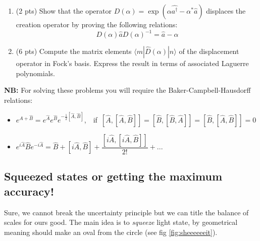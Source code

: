 \begin{hw}


	\begin{enumerate}
	
	\item (2 pts) Show that the  operator $D(\alpha)=\exp(\alpha\hat{a^\dagger}-\alpha^*\hat{a})$ { displaces} the creation operator by proving the following relations:
	$$
	D(\alpha)\hat{a}D(\alpha)^{-1}=\hat{a}-\alpha
	$$
	\item (6 pts) Compute the matrix elements $\langle m| \hat{D}(\alpha)|n\rangle$ of the displacement operator in Fock's basis. Express the result in terms of associated Laguerre polynomials.
	
	\end{enumerate}
	
	
	{\bf NB:} For solving these problems  you will require the Baker-Campbell-Hausdorff  relations:
	\begin{itemize}
	\item $e^{\hat A+\hat B}=e^{\hat A}e^{\hat B}e^{-\frac{1}{2}[\hat A, \hat B]}$,\ \  if\  $[\hat A,[\hat A,\hat B]]=[\hat B,[\hat B,\hat A]]=[\hat B,[\hat A,\hat B]]=0$
	\item $e^{i\hat A}\hat Be^{-i\hat A} = \hat B + [i\hat A,\hat B] + \dfrac{[i\hat A,[i\hat A,\hat B]]}{2!} + ...$
	\end{itemize}
\end{hw}

\subsection{Squeezed states or getting the maximum accuracy!}

Sure, we cannot break the uncertainty principle but we can title the balance of scales for ours good. The main idea is to \textit{squeeze} light state, by geometrical meaning should make an oval from the circle (see fig \ref{fig:sheeeeeeit}).

